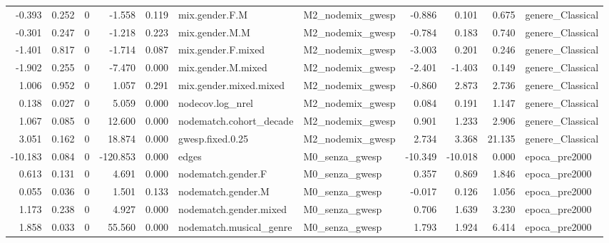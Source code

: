 \begin{table}
\begin{tabular}{rrrrrllrrrl}
   -0.393 & 0.252 &        0 &   -1.558 &     0.119 &          mix.gender.F.M & M2\_nodemix\_gwesp &  -0.886 &   0.101 &   0.675 &            genere\_Classical \\
   -0.301 & 0.247 &        0 &   -1.218 &     0.223 &          mix.gender.M.M & M2\_nodemix\_gwesp &  -0.784 &   0.183 &   0.740 &            genere\_Classical \\
   -1.401 & 0.817 &        0 &   -1.714 &     0.087 &      mix.gender.F.mixed & M2\_nodemix\_gwesp &  -3.003 &   0.201 &   0.246 &            genere\_Classical \\
   -1.902 & 0.255 &        0 &   -7.470 &     0.000 &      mix.gender.M.mixed & M2\_nodemix\_gwesp &  -2.401 &  -1.403 &   0.149 &            genere\_Classical \\
    1.006 & 0.952 &        0 &    1.057 &     0.291 &  mix.gender.mixed.mixed & M2\_nodemix\_gwesp &  -0.860 &   2.873 &   2.736 &            genere\_Classical \\
    0.138 & 0.027 &        0 &    5.059 &     0.000 &        nodecov.log\_nrel & M2\_nodemix\_gwesp &   0.084 &   0.191 &   1.147 &            genere\_Classical \\
    1.067 & 0.085 &        0 &   12.600 &     0.000 & nodematch.cohort\_decade & M2\_nodemix\_gwesp &   0.901 &   1.233 &   2.906 &            genere\_Classical \\
    3.051 & 0.162 &        0 &   18.874 &     0.000 &        gwesp.fixed.0.25 & M2\_nodemix\_gwesp &   2.734 &   3.368 &  21.135 &            genere\_Classical \\
  -10.183 & 0.084 &        0 & -120.853 &     0.000 &                   edges &   M0\_senza\_gwesp & -10.349 & -10.018 &   0.000 &               epoca\_pre2000 \\
    0.613 & 0.131 &        0 &    4.691 &     0.000 &      nodematch.gender.F &   M0\_senza\_gwesp &   0.357 &   0.869 &   1.846 &               epoca\_pre2000 \\
    0.055 & 0.036 &        0 &    1.501 &     0.133 &      nodematch.gender.M &   M0\_senza\_gwesp &  -0.017 &   0.126 &   1.056 &               epoca\_pre2000 \\
    1.173 & 0.238 &        0 &    4.927 &     0.000 &  nodematch.gender.mixed &   M0\_senza\_gwesp &   0.706 &   1.639 &   3.230 &               epoca\_pre2000 \\
    1.858 & 0.033 &        0 &   55.560 &     0.000 & nodematch.musical\_genre &   M0\_senza\_gwesp &   1.793 &   1.924 &   6.414 &               epoca\_pre2000 \\

\end{tabular}
\end{table}
